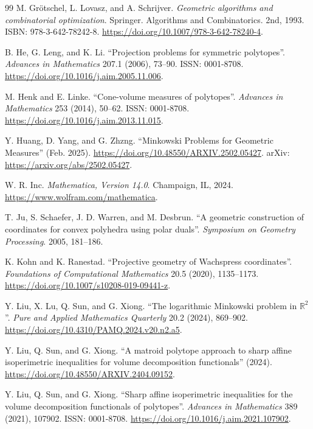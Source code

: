 \documentclass[11pt, a4paper, twoside, reqno]{amsart}
\theoremstyle{definition}
\theoremstyle{remark}
\numberwithin{equation}{section}
\begin{document}
\begin{thebibliography}{99}
M. Gr\"otschel, L. Lovasz, and A. Schrijver. \emph{Geometric algorithms and combinatorial optimization}. Springer. Algorithms and Combinatorics. 2nd, 1993. ISBN: 978-3-642-78242-8. \url{https://doi.org/10.1007/978-3-642-78240-4}.

B. He, G. Leng, and K. Li. ``Projection problems for symmetric polytopes''. \emph{Advances in Mathematics} 207.1 (2006), 73--90. ISSN: 0001-8708. \url{https://doi.org/10.1016/j.aim.2005.11.006}.

M. Henk and E. Linke. ``Cone-volume measures of polytopes''. \emph{Advances in Mathematics} 253 (2014), 50--62. ISSN: 0001-8708. \url{https://doi.org/10.1016/j.aim.2013.11.015}.

Y. Huang, D. Yang, and G. Zhzng. ``Minkowski Problems for Geometric Measures'' (Feb. 2025). \url{https://doi.org/10.48550/ARXIV.2502.05427}. arXiv: \url{https://arxiv.org/abs/2502.05427}.

W. R. Inc. \emph{Mathematica, Version 14.0}. Champaign, IL, 2024. \url{https://www.wolfram.com/mathematica}.

T. Ju, S. Schaefer, J. D. Warren, and M. Desbrun. ``A geometric construction of coordinates for convex polyhedra using polar duals''. \emph{Symposium on Geometry Processing}. 2005, 181--186.

K. Kohn and K. Ranestad. ``Projective geometry of Wachspress coordinates''. \emph{Foundations of Computational Mathematics} 20.5 (2020), 1135--1173. \url{https://doi.org/10.1007/s10208-019-09441-z}.

Y. Liu, X. Lu, Q. Sun, and G. Xiong. ``The logarithmic Minkowski problem in $\mathbb{R}^2$''. \emph{Pure and Applied Mathematics Quarterly} 20.2 (2024), 869--902. \url{https://doi.org/10.4310/PAMQ.2024.v20.n2.a5}.

Y. Liu, Q. Sun, and G. Xiong. ``A matroid polytope approach to sharp affine isoperimetric inequalities for volume decomposition functionals'' (2024). \url{https://doi.org/10.48550/ARXIV.2404.09152}.

Y. Liu, Q. Sun, and G. Xiong. ``Sharp affine isoperimetric inequalities for the volume decomposition functionals of polytopes''. \emph{Advances in Mathematics} 389 (2021), 107902. ISSN: 0001-8708. \url{https://doi.org/10.1016/j.aim.2021.107902}.


\end{thebibliography}
\end{document}

